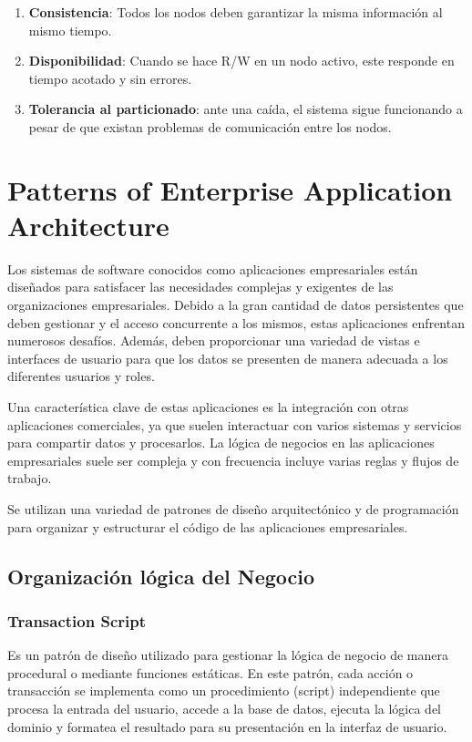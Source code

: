 \documentclass{article}
\begin{document}
		\pagebreak
		\begin{enumerate}
			\item {\textbf{Consistencia}}: Todos los nodos deben garantizar la misma información al	mismo tiempo.
			
			\item {\textbf{Disponibilidad}}: Cuando se hace	R/W en un nodo activo, este responde en tiempo acotado y sin errores.
			
			\item {\textbf{Tolerancia al particionado}}: ante una caída, el sistema sigue funcionando a pesar de que existan problemas de comunicación entre los nodos.
		\end{enumerate}
		
		
		
		
		\section{Patterns of Enterprise Application Architecture}
		Los sistemas de software conocidos como aplicaciones empresariales están diseñados para satisfacer las necesidades complejas y exigentes de las organizaciones empresariales. Debido a la gran cantidad de datos persistentes que deben gestionar y el acceso concurrente a los mismos, estas aplicaciones enfrentan numerosos desafíos. Además, deben proporcionar una variedad de vistas e interfaces de usuario para que los datos se presenten de manera adecuada a los diferentes usuarios y roles.
		
		Una característica clave de estas aplicaciones es la integración con otras aplicaciones comerciales, ya que suelen interactuar con varios sistemas y servicios para compartir datos y procesarlos. La lógica de negocios en las aplicaciones empresariales suele ser compleja y con frecuencia incluye varias reglas y flujos de trabajo.
		
		Se utilizan una variedad de patrones de diseño arquitectónico y de programación para organizar y estructurar el código de las aplicaciones empresariales. 
		
		\subsection{Organización lógica del Negocio}
		\subsubsection{Transaction Script}
		Es un patrón de diseño utilizado para gestionar la lógica de negocio de manera procedural o mediante funciones estáticas. En este patrón, cada acción o transacción se implementa como un procedimiento (script) independiente que procesa la entrada del usuario, accede a la base de datos, ejecuta la lógica del dominio y formatea el resultado para su presentación en la interfaz de usuario.
\end{document}
